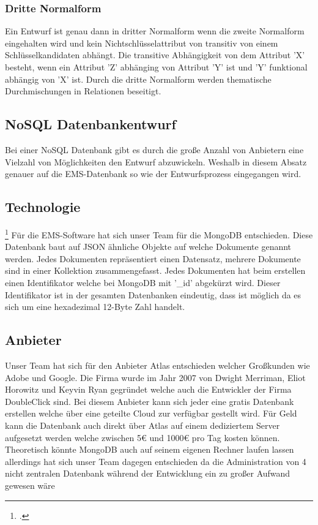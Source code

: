 			\subsubsection*{Dritte Normalform}
				Ein Entwurf ist genau dann in dritter Normalform wenn die zweite Normalform eingehalten wird und kein Nichtschlüsselattribut von transitiv von einem Schlüsselkandidaten abhängt. 
				Die transitive Abhängigkeit von dem Attribut 'X' besteht, wenn ein Attribut 'Z' abhänging von Attribut 'Y' ist und 'Y' funktional abhängig von 'X' ist. 
				Durch die dritte Normalform werden thematische Durchmischungen in Relationen beseitigt. 
			
		\subsection{NoSQL Datenbankentwurf}
			Bei einer NoSQL Datenbank gibt es durch die große Anzahl von Anbietern eine Vielzahl von Möglichkeiten den Entwurf abzuwickeln. 
			Weshalb in diesem Absatz genauer auf die EMS-Datenbank so wie der Entwurfsprozess eingegangen wird. 
			
			\subsection{Technologie} \footcite{mongohistory}
			Für die EMS-Software hat sich unser Team für die MongoDB entschieden. Diese Datenbank baut auf JSON ähnliche Objekte auf welche Dokumente genannt werden. 
			Jedes Dokumenten repräsentiert einen Datensatz, mehrere Dokumente sind in einer Kollektion zusammengefasst. 
			Jedes Dokumenten hat beim erstellen einen Identifikator welche bei MongoDB mit '\_id' abgekürzt wird. 
			Dieser Identifikator ist in der gesamten Datenbanken eindeutig, dass ist möglich da es sich um eine hexadezimal 12-Byte Zahl handelt. 

			\subsection{Anbieter}
			Unser Team hat sich für den Anbieter Atlas entschieden welcher Großkunden wie Adobe und Google. Die Firma wurde im Jahr 2007 von Dwight Merriman, Eliot Horowitz und Keyvin Ryan gegründet welche auch die Entwickler der Firma DoubleClick sind. 
			Bei diesem Anbieter kann sich jeder eine gratis Datenbank erstellen welche über eine geteilte Cloud zur verfügbar gestellt wird. 
			Für Geld kann die Datenbank auch direkt über Atlas auf einem dediziertem Server aufgesetzt werden welche zwischen 5€ und 1000€ pro Tag kosten können. 
			Theoretisch könnte MongoDB auch auf seinem eigenen Rechner laufen lassen allerdings hat sich unser Team dagegen entschieden da die Administration von 4 nicht zentralen Datenbank während der Entwicklung ein zu großer Aufwand gewesen wäre
		
